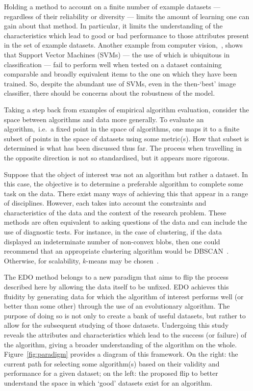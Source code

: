 Holding a method to account on a finite number of example datasets ---
regardless of their reliability or diversity --- limits the amount of learning
one can gain about that method. In particular, it limits the understanding of
the characteristics which lead to good or bad performance to those attributes
present in the set of example datasets. Another example from computer
vision,~\cite{Torralba2011}, shows that Support Vector Machines (SVMs) --- the
use of which is ubiquitous in classification --- fail to perform well when
tested on a dataset containing comparable and broadly equivalent items to the
one on which they have been trained. So, despite the abundant use of SVMs, even
in the then-`best' image classifier, there should be concerns about the
robustness of the model.

Taking a step back from examples of empirical algorithm evaluation, consider the
space between algorithms and data more generally. To evaluate an
algorithm,~i.e.\ a fixed point in the space of algorithms, one maps it to a
finite subset of points in the space of datasets using some metric(s). How that
subset is determined is what has been discussed thus far. The process when
travelling in the opposite direction is not so standardised, but it appears more
rigorous.

Suppose that the object of interest was not an algorithm but rather a dataset.
In this case, the objective is to determine a preferable algorithm to complete
some task on the data. There exist many ways of achieving this that appear in a
range of disciplines. However, each takes into account the constraints and
characteristics of the data and the context of the research problem. These
methods are often equivalent to asking questions of the data and can include the
use of diagnostic tests. For instance, in the case of clustering, if the data
displayed an indeterminate number of non-convex blobs, then one could recommend
that an appropriate clustering algorithm would be DBSCAN~\cite{Ester1996}.
Otherwise, for scalability, \(k\)-means may be chosen~\cite{Wu2009,Zhao2009}.

The EDO method belongs to a new paradigm that aims to flip the process described
here by allowing the data itself to be unfixed. EDO achieves this fluidity by
generating data for which the algorithm of interest performs well (or better
than some other) through the use of an evolutionary algorithm. The purpose of
doing so is not only to create a bank of useful datasets, but rather to allow
for the subsequent studying of those datasets. Undergoing this study reveals
the attributes and characteristics which lead to the success (or failure) of the
algorithm, giving a broader understanding of the algorithm on the whole.
Figure~\ref{fig:paradigm} provides a diagram of this framework. On the right:
the current path for selecting some algorithm(s) based on their validity and
performance for a given dataset; on the left: the proposed flip to better
understand the space in which `good' datasets exist for an algorithm.

